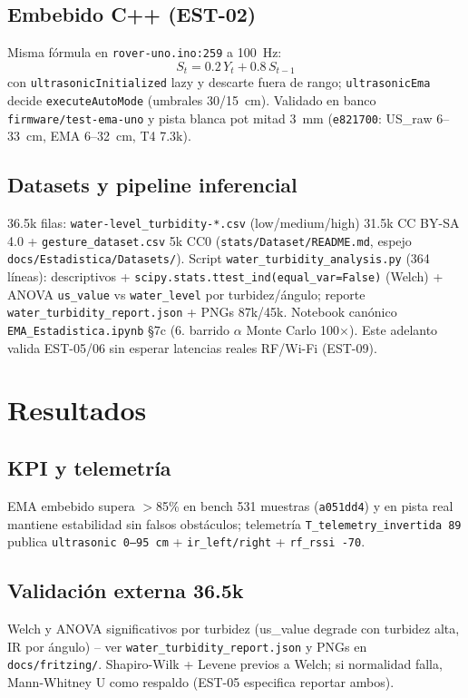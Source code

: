\documentclass[conference]{IEEEtran}
\begin{document}
\subsection{Embebido C++ (EST-02)}
Misma fórmula en \texttt{rover-uno.ino:259} a 100~Hz:
\begin{equation}
S_t = 0.2\,Y_t + 0.8\,S_{t-1}
\end{equation}
con \texttt{ultrasonicInitialized} lazy y descarte fuera de rango; \texttt{ultrasonicEma} decide \texttt{executeAutoMode} (umbrales 30/15~cm). Validado en banco \texttt{firmware/test-ema-uno} y pista blanca pot mitad 3~mm (\texttt{e821700}: US\_raw 6--33~cm, EMA 6--32~cm, T4 7.3k).

\subsection{Datasets y pipeline inferencial}
36.5k filas: \texttt{water-level\_turbidity-*.csv} (low/medium/high) 31.5k CC BY-SA 4.0 + \texttt{gesture\_dataset.csv} 5k CC0 (\texttt{stats/Dataset/README.md}, espejo \texttt{docs/Estadistica/Datasets/}). Script \texttt{water\_turbidity\_analysis.py} (364 líneas): descriptivos + \texttt{scipy.stats.ttest\_ind(equal\_var=False)} (Welch) + ANOVA \texttt{us\_value} vs \texttt{water\_level} por turbidez/ángulo; reporte \texttt{water\_turbidity\_report.json} + PNGs 87k/45k. Notebook canónico \texttt{EMA\_Estadistica.ipynb} \S7c (6. barrido $\alpha$ Monte Carlo 100$\times$). Este adelanto valida EST-05/06 sin esperar latencias reales RF/Wi-Fi (EST-09).

\section{Resultados}
\subsection{KPI y telemetría}
EMA embebido supera $>$85\% en bench 531 muestras (\texttt{a051dd4}) y en pista real mantiene estabilidad sin falsos obstáculos; telemetría \texttt{T\_telemetry\_invertida 89} publica \texttt{ultrasonic 0--95~cm} + \texttt{ir\_left/right} + \texttt{rf\_rssi -70}.

\subsection{Validación externa 36.5k}
Welch y ANOVA significativos por turbidez (us\_value degrade con turbidez alta, IR por ángulo) -- ver \texttt{water\_turbidity\_report.json} y PNGs en \texttt{docs/fritzing/}. Shapiro-Wilk + Levene previos a Welch; si normalidad falla, Mann-Whitney U como respaldo (EST-05 especifica reportar ambos).
\end{document}
